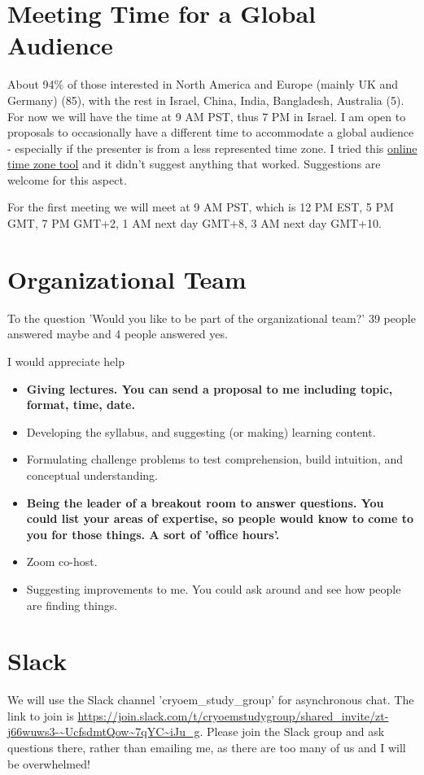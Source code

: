 \documentclass[11pt, oneside]{article}   	%
\begin{document}
\section{Meeting Time for a Global Audience}
About 94\% of those interested in North America and Europe (mainly UK and Germany) (85), with the rest in Israel, China, India, Bangladesh, Australia (5). For now we will have the time at 9 AM PST, thus 7 PM in Israel. I am open to proposals to occasionally have a different time to accommodate a global audience - especially if the presenter is from a less represented time zone. I tried this \href{https://www.timeanddate.com/worldclock/meeting.html}{online time zone tool} and it didn't suggest anything that worked. Suggestions are welcome for this aspect.

For the first meeting we will meet at 9 AM PST, which is 12 PM EST, 5 PM GMT, 7 PM GMT+2, 1 AM next day GMT+8, 3 AM next day GMT+10.

\section{Organizational Team}
To the question 'Would you like to be part of the organizational team?' 39 people answered maybe and 4 people answered yes.

I would appreciate help 
\begin{itemize}
	\item {\bf Giving lectures. You can send a proposal to me including topic, format, time, date.}
	\item Developing the syllabus, and suggesting (or making) learning content.
	\item Formulating challenge problems to test comprehension, build intuition, and conceptual understanding.
	\item {\bf Being the leader of a breakout room to answer questions. You could list your areas of expertise, so people would know to come to you for those things. A sort of 'office hours'.}
	\item Zoom co-host.
	\item Suggesting improvements to me. You could ask around and see how people are finding things.
\end{itemize}

\section{Slack}
We will use the Slack channel 'cryoem\_study\_group' for asynchronous chat. The link to join is 
{\tiny \url{https://join.slack.com/t/cryoemstudygroup/shared\_invite/zt-j66wuws3-~UcfsdmtQow~7qYC~iJu\_g}}. Please join the Slack group and ask questions there, rather than emailing me, as there are too many of us and I will be overwhelmed!
\end{document}
